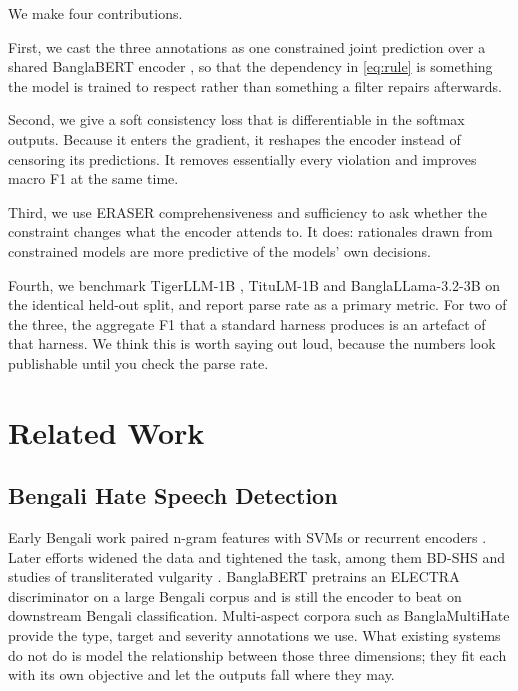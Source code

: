 \documentclass[conference]{IEEEtran}
\begin{document}
We make four contributions.

First, we cast the three annotations as one constrained joint prediction over a shared BanglaBERT encoder \cite{bhattacharjee2022banglabert}, so that the dependency in \eqref{eq:rule} is something the model is trained to respect rather than something a filter repairs afterwards.

Second, we give a soft consistency loss that is differentiable in the softmax outputs. Because it enters the gradient, it reshapes the encoder instead of censoring its predictions. It removes essentially every violation and improves macro F1 at the same time.

Third, we use ERASER comprehensiveness and sufficiency \cite{deyoung2020eraser} to ask whether the constraint changes what the encoder attends to. It does: rationales drawn from constrained models are more predictive of the models' own decisions.

Fourth, we benchmark TigerLLM-1B \cite{raihan2025tigerllm}, TituLM-1B \cite{hishab2024titullm} and BanglaLLama-3.2-3B \cite{banglallm2024bongllama} on the identical held-out split, and report parse rate as a primary metric. For two of the three, the aggregate F1 that a standard harness produces is an artefact of that harness. We think this is worth saying out loud, because the numbers look publishable until you check the parse rate.

\section{Related Work}
\label{sec:related}

\subsection{Bengali Hate Speech Detection}
Early Bengali work paired n-gram features with SVMs or recurrent encoders \cite{romero2019bengali, islam2021bangla}. Later efforts widened the data and tightened the task, among them BD-SHS \cite{romim2022bdshs} and studies of transliterated vulgarity \cite{sazzed2021vulgarity}. BanglaBERT \cite{bhattacharjee2022banglabert} pretrains an ELECTRA discriminator \cite{clark2020electra} on a large Bengali corpus and is still the encoder to beat on downstream Bengali classification. Multi-aspect corpora such as BanglaMultiHate \cite{hasan2026banglamultihate, hasan2023banglamultihate} provide the type, target and severity annotations we use. What existing systems do not do is model the relationship between those three dimensions; they fit each with its own objective and let the outputs fall where they may.
\end{document}

